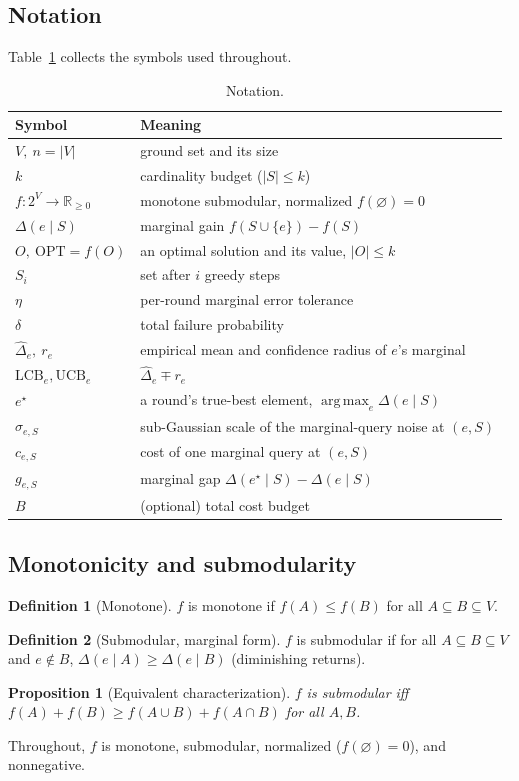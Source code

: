 \documentclass[11pt]{article}
\theoremstyle{plain}
\newtheorem{proposition}{Proposition}
\theoremstyle{definition}
\newtheorem{definition}{Definition}
\newcommand{\R}{\mathbb{R}}
\newcommand{\OPT}{\mathrm{OPT}}
\newcommand{\LCB}{\mathrm{LCB}}
\newcommand{\UCB}{\mathrm{UCB}}
\newcommand{\marg}[2]{\Delta(#1\mid #2)}
\DeclareMathOperator*{\argmax}{arg\,max}
\begin{document}
\subsection{Notation}
Table~\ref{tab:notation} collects the symbols used throughout.

\begin{table}[H]
\centering\small
\caption{Notation.}\label{tab:notation}
\begin{tabular}{ll}
\toprule
Symbol & Meaning\\
\midrule
$V,\ n=|V|$ & ground set and its size\\
$k$ & cardinality budget ($|S|\le k$)\\
$f:2^V\to\R_{\ge0}$ & monotone submodular, normalized $f(\varnothing)=0$\\
$\marg{e}{S}$ & marginal gain $f(S\cup\{e\})-f(S)$\\
$O,\ \OPT=f(O)$ & an optimal solution and its value, $|O|\le k$\\
$S_i$ & set after $i$ greedy steps\\
$\eta$ & per-round marginal error tolerance\\
$\delta$ & total failure probability\\
$\widehat\Delta_e,\ r_e$ & empirical mean and confidence radius of $e$'s marginal\\
$\LCB_e,\UCB_e$ & $\widehat\Delta_e\mp r_e$\\
$e^\star$ & a round's true-best element, $\argmax_{e}\marg{e}{S}$\\
$\sigma_{e,S}$ & sub-Gaussian scale of the marginal-query noise at $(e,S)$\\
$c_{e,S}$ & cost of one marginal query at $(e,S)$\\
$g_{e,S}$ & marginal gap $\marg{e^\star}{S}-\marg{e}{S}$\\
$B$ & (optional) total cost budget\\
\bottomrule
\end{tabular}
\end{table}

\subsection{Monotonicity and submodularity}
\begin{definition}[Monotone]
$f$ is monotone if $f(A)\le f(B)$ for all $A\subseteq B\subseteq V$.
\end{definition}
\begin{definition}[Submodular, marginal form]\label{def:submod}
$f$ is submodular if for all $A\subseteq B\subseteq V$ and $e\notin B$,
$\marg{e}{A}\ge\marg{e}{B}$ (diminishing returns).
\end{definition}
\begin{proposition}[Equivalent characterization]
$f$ is submodular iff $f(A)+f(B)\ge f(A\cup B)+f(A\cap B)$ for all $A,B$.
\end{proposition}
Throughout, $f$ is monotone, submodular, normalized ($f(\varnothing)=0$),
and nonnegative.
\end{document}
